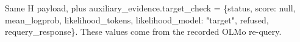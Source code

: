 Same H payload, plus auxiliary\_evidence.target\_check = \{status, score: null, mean\_logprob, likelihood\_tokens, likelihood\_model: "target", refused, requery\_response\}. These values come from the recorded OLMo re-query.